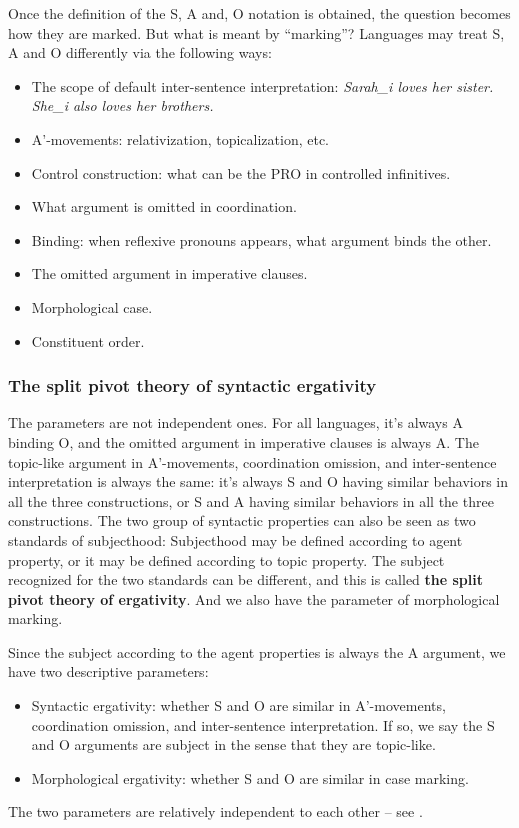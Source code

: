 \documentclass{article}
\newcommand*{\concept}[1]{\textbf{#1}}
\newcommand*{\corpus}[1]{\emph{#1}}
\begin{document}
Once the definition of the S, A and, O notation is obtained, 
the question becomes how they are marked.
But what is meant by ``marking''?
Languages may treat S, A and O differently via the following ways:
\begin{itemize} 
    \item The scope of default inter-sentence interpretation:
    \corpus{Sarah_i loves her sister. She_i also loves her brothers.}
    \item A'-movements: relativization, topicalization, etc.
    \item Control construction: what can be the PRO in controlled infinitives.
    \item What argument is omitted in coordination.
    \item Binding: when reflexive pronouns appears, 
    what argument binds the other.
    \item The omitted argument in imperative clauses.
    \item Morphological case.
    \item Constituent order.
\end{itemize}

\subsubsection{The split pivot theory of syntactic ergativity}\label{sec:split-pivot}

The parameters are not independent ones.
For all languages, it's always A binding O, 
and the omitted argument in imperative clauses is always A.
The topic-like argument in A'-movements, coordination omission, and inter-sentence interpretation
is always the same: 
it's always S and O having similar behaviors in all the three constructions,
or S and A having similar behaviors in all the three constructions.
The two group of syntactic properties can also be seen as two standards of subjecthood:
Subjecthood may be defined according to agent property,
or it may be defined according to topic property.
The subject recognized for the two standards can be different,
and this is called \concept{the split pivot theory of ergativity}.
And we also have the parameter of morphological marking.

Since the subject according to the agent properties 
is always the A argument, 
we have two descriptive parameters:
\begin{itemize}
    \item Syntactic ergativity: whether S and O are similar 
    in A'-movements, coordination omission, and inter-sentence interpretation.
    If so, we say the S and O arguments are subject 
    in the sense that they are topic-like.
    \item Morphological ergativity: whether S and O are similar in case marking.
\end{itemize}
The two parameters are relatively independent to each other -- 
see .
\end{document}
